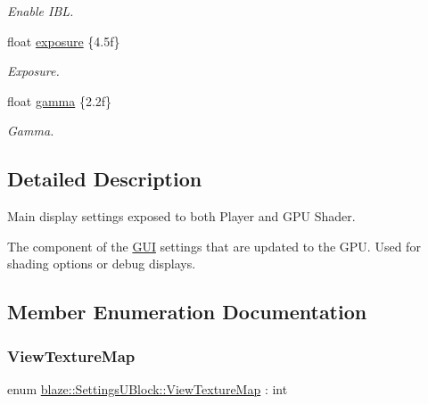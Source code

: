 \begin{DoxyCompactItemize}
\begin{tabbing}
\end{tabbing}\begin{DoxyCompactList}\small\item\em Enable I\+BL. \end{DoxyCompactList}\item 
\mbox{\label{structblaze_1_1SettingsUBlock_a29dfda46fbf1c291506a57d5abc07423}} 
float \hyperlink{structblaze_1_1SettingsUBlock_a29dfda46fbf1c291506a57d5abc07423}{exposure} \{4.\+5f\}
\begin{DoxyCompactList}\small\item\em Exposure. \end{DoxyCompactList}\item 
\mbox{\label{structblaze_1_1SettingsUBlock_ae9af586007d118e4253937aff6a4c92a}} 
float \hyperlink{structblaze_1_1SettingsUBlock_ae9af586007d118e4253937aff6a4c92a}{gamma} \{2.\+2f\}
\begin{DoxyCompactList}\small\item\em Gamma. \end{DoxyCompactList}\end{DoxyCompactItemize}


\subsection{Detailed Description}
Main display settings exposed to both Player and G\+PU Shader. 

The component of the \hyperlink{classblaze_1_1GUI}{G\+UI} settings that are updated to the G\+PU. Used for shading options or debug displays. 

\subsection{Member Enumeration Documentation}
\mbox{\label{structblaze_1_1SettingsUBlock_aa79fb061eee4130840f5ba7a8b36fdff}} 
\subsubsection{\texorpdfstring{View\+Texture\+Map}{ViewTextureMap}}
{\footnotesize\ttfamily enum \hyperlink{structblaze_1_1SettingsUBlock_aa79fb061eee4130840f5ba7a8b36fdff}{blaze\+::\+Settings\+U\+Block\+::\+View\+Texture\+Map} \+: int}



